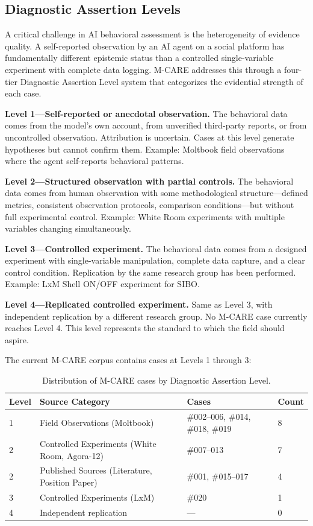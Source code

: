 \documentclass[11pt]{article}
\begin{document}
\subsection{Diagnostic Assertion Levels}

A critical challenge in AI behavioral assessment is the heterogeneity of evidence quality. A self-reported observation by an AI agent on a social platform has fundamentally different epistemic status than a controlled single-variable experiment with complete data logging. M-CARE addresses this through a four-tier Diagnostic Assertion Level system that categorizes the evidential strength of each case.

\textbf{Level 1---Self-reported or anecdotal observation.} The behavioral data comes from the model's own account, from unverified third-party reports, or from uncontrolled observation. Attribution is uncertain. Cases at this level generate hypotheses but cannot confirm them. Example: Moltbook field observations where the agent self-reports behavioral patterns.

\textbf{Level 2---Structured observation with partial controls.} The behavioral data comes from human observation with some methodological structure---defined metrics, consistent observation protocols, comparison conditions---but without full experimental control. Example: White Room experiments with multiple variables changing simultaneously.

\textbf{Level 3---Controlled experiment.} The behavioral data comes from a designed experiment with single-variable manipulation, complete data capture, and a clear control condition. Replication by the same research group has been performed. Example: LxM Shell ON/OFF experiment for SIBO.

\textbf{Level 4---Replicated controlled experiment.} Same as Level 3, with independent replication by a different research group. No M-CARE case currently reaches Level 4. This level represents the standard to which the field should aspire.

The current M-CARE corpus contains cases at Levels 1 through 3:

\begin{table}[h]
\centering
\caption{Distribution of M-CARE cases by Diagnostic Assertion Level.}
\small
\begin{tabularx}{\textwidth}{@{}l X l l@{}}
\toprule
Level & Source Category & Cases & Count \\
\midrule
1 & Field Observations (Moltbook) & \#002--006, \#014, \#018, \#019 & 8 \\
2 & Controlled Experiments (White Room, Agora-12) & \#007--013 & 7 \\
2 & Published Sources (Literature, Position Paper) & \#001, \#015--017 & 4 \\
3 & Controlled Experiments (LxM) & \#020 & 1 \\
4 & Independent replication & --- & 0 \\
\bottomrule
\end{tabularx}
\end{table}
\end{document}
